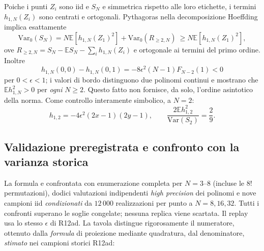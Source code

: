 \documentclass[11pt,a4paper]{article}
\begin{document}
Poiche i punti $Z_i$ sono iid e $S_N$ e simmetrica rispetto alle loro etichette, i termini $h_{1,N}(Z_i)$ sono centrati e ortogonali. Pythagoras nella decomposizione Hoeffding implica esattamente
\begin{equation}
 \boxed{\mathrm{Var}_0(S_N)
 =N\mathbb E[h_{1,N}(Z_1)^2]+\mathrm{Var}_0(R_{\ge2,N})
 \ \ge N\mathbb E[h_{1,N}(Z_1)^2],}
 \label{eq:r12ae_variance_lower}
\end{equation}
ove $R_{\ge2,N}=S_N-\mathbb E S_N-\sum_i h_{1,N}(Z_i)$ e ortogonale ai termini del primo ordine. Inoltre
\begin{equation}
 h_{1,N}(0,0)-h_{1,N}(0,1)
 =-8\epsilon^2(N-1)F_{N-2}(1)<0
 \label{eq:r12ae_nonzero}
\end{equation}
per $0<\epsilon<1$; i valori di bordo distinguono due polinomi continui e mostrano che $\mathbb Eh_{1,N}^2>0$ per \emph{ogni} $N\ge2$. Questo fatto non fornisce, da solo, l'ordine asintotico della norma. Come controllo interamente simbolico, a $N=2$:
\begin{equation}
 h_{1,2}=-4\epsilon^2(2x-1)(2y-1),\qquad
 \frac{2\mathbb Eh_{1,2}^2}{\mathrm{Var}(S_2)}=\frac29.
 \label{eq:r12ae_n2}
\end{equation}

\subsection{Validazione preregistrata e confronto con la varianza storica}

La formula e confrontata con enumerazione completa per $N=3$--$8$ (incluse le $8!$ permutazioni), dodici valutazioni indipendenti \emph{high precision} dei polinomi e nove campioni iid \emph{condizionati} da $12\,000$ realizzazioni per punto a $N=8,16,32$. Tutti i confronti superano le soglie congelate; nessuna replica viene scartata. Il replay usa lo stesso $\epsilon$ di R12ad. La tavola distingue rigorosamente il numeratore, ottenuto dalla \emph{formula} di proiezione mediante quadratura, dal denominatore, \emph{stimato} nei campioni storici R12ad:
\end{document}
